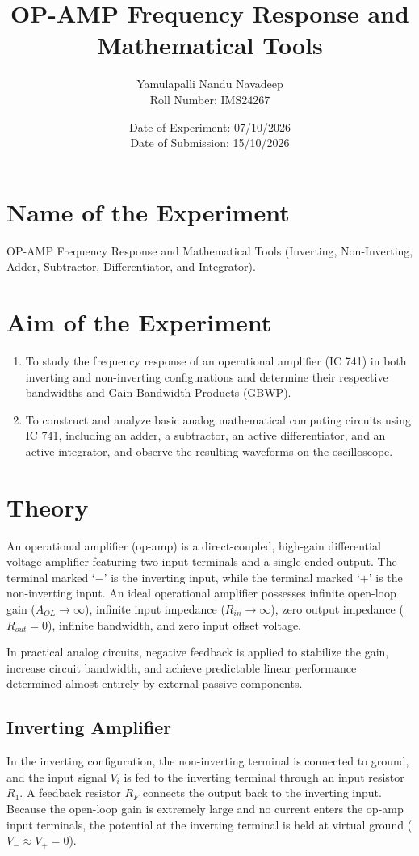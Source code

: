 \documentclass[12pt,a4paper]{article}
\title{\textbf{OP-AMP Frequency Response and Mathematical Tools}}
\author{Yamulapalli Nandu Navadeep \\ Roll Number: IMS24267}
\date{Date of Experiment: 07/10/2026 \\ Date of Submission: 15/10/2026}
\begin{document}
\maketitle

\section{Name of the Experiment}
OP-AMP Frequency Response and Mathematical Tools (Inverting, Non-Inverting, Adder, Subtractor, Differentiator, and Integrator).

\section{Aim of the Experiment}
\begin{enumerate}
    \item To study the frequency response of an operational amplifier (IC 741) in both inverting and non-inverting configurations and determine their respective bandwidths and Gain-Bandwidth Products (GBWP).
    \item To construct and analyze basic analog mathematical computing circuits using IC 741, including an adder, a subtractor, an active differentiator, and an active integrator, and observe the resulting waveforms on the oscilloscope.
\end{enumerate}

\section{Theory}
An operational amplifier (op-amp) is a direct-coupled, high-gain differential voltage amplifier featuring two input terminals and a single-ended output. The terminal marked `$-$' is the inverting input, while the terminal marked `$+$' is the non-inverting input. An ideal operational amplifier possesses infinite open-loop gain ($A_{OL} \to \infty$), infinite input impedance ($R_{in} \to \infty$), zero output impedance ($R_{out} = 0$), infinite bandwidth, and zero input offset voltage.

In practical analog circuits, negative feedback is applied to stabilize the gain, increase circuit bandwidth, and achieve predictable linear performance determined almost entirely by external passive components.

\subsection{Inverting Amplifier}
In the inverting configuration, the non-inverting terminal is connected to ground, and the input signal $V_i$ is fed to the inverting terminal through an input resistor $R_1$. A feedback resistor $R_F$ connects the output back to the inverting input. Because the open-loop gain is extremely large and no current enters the op-amp input terminals, the potential at the inverting terminal is held at virtual ground ($V_- \approx V_+ = 0$).
\end{document}
